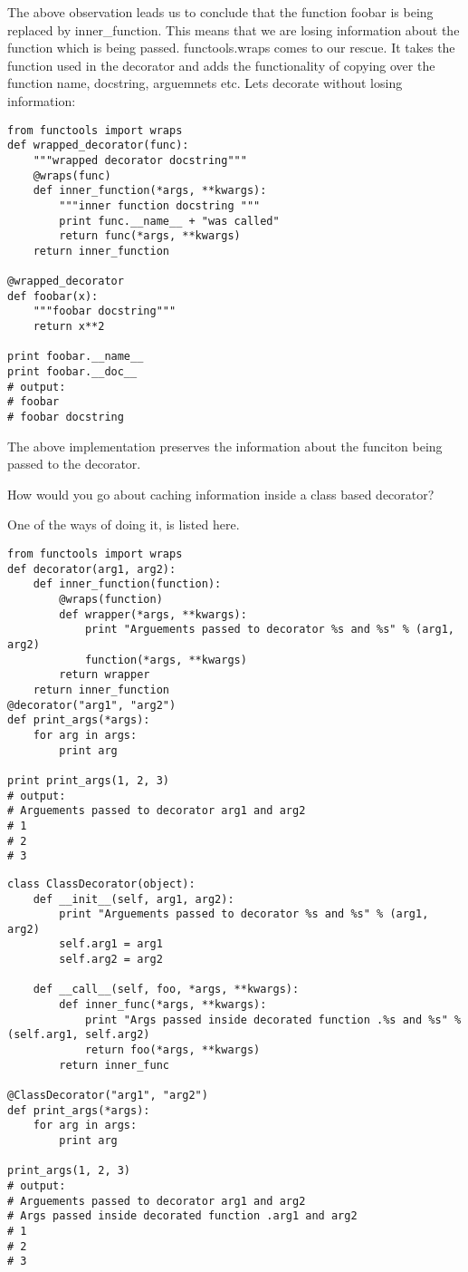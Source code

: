 The above observation leads us to conclude that the function foobar is being replaced by inner\_function. This means that we are losing information about the function which is being passed. functools.wraps comes to our rescue. It takes the function used in the decorator and adds the functionality of copying over the function name, docstring, arguemnets etc. Lets decorate without losing information:

\begin{verbatim}
from functools import wraps
def wrapped_decorator(func):
    """wrapped decorator docstring"""
    @wraps(func)
    def inner_function(*args, **kwargs):
        """inner function docstring """
        print func.__name__ + "was called"
        return func(*args, **kwargs)
    return inner_function

@wrapped_decorator
def foobar(x):
    """foobar docstring"""
    return x**2

print foobar.__name__
print foobar.__doc__
# output:
# foobar
# foobar docstring
\end{verbatim}
The above implementation preserves the information about the funciton being passed to the decorator.

How would you go about caching information inside a class based decorator?

One of the ways of doing it, is listed here.
\begin{verbatim}
from functools import wraps
def decorator(arg1, arg2):
    def inner_function(function):
        @wraps(function)
        def wrapper(*args, **kwargs):
            print "Arguements passed to decorator %s and %s" % (arg1, arg2)
            function(*args, **kwargs)
        return wrapper
    return inner_function
@decorator("arg1", "arg2")
def print_args(*args):
    for arg in args:
        print arg

print print_args(1, 2, 3)
# output:
# Arguements passed to decorator arg1 and arg2
# 1
# 2
# 3
\end{verbatim}

\begin{verbatim}
class ClassDecorator(object):
    def __init__(self, arg1, arg2):
        print "Arguements passed to decorator %s and %s" % (arg1, arg2)
        self.arg1 = arg1
        self.arg2 = arg2

    def __call__(self, foo, *args, **kwargs):
        def inner_func(*args, **kwargs):
            print "Args passed inside decorated function .%s and %s" % (self.arg1, self.arg2)
            return foo(*args, **kwargs)
        return inner_func

@ClassDecorator("arg1", "arg2")
def print_args(*args):
    for arg in args:
        print arg

print_args(1, 2, 3)
# output:
# Arguements passed to decorator arg1 and arg2
# Args passed inside decorated function .arg1 and arg2
# 1
# 2
# 3
\end{verbatim}

